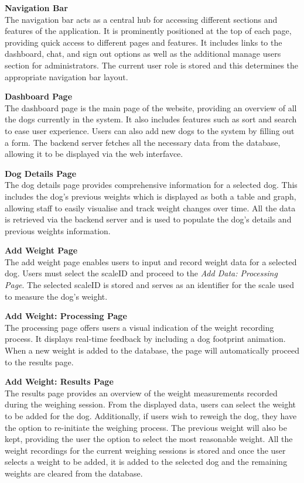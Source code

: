 \textbf{Navigation Bar}\\
The navigation bar acts as a central hub for accessing different sections and features of the application. It is prominently positioned at the top of each page, providing quick access to different pages and features. It includes links to the dashboard, chat, and sign out options as well as the additional manage users section for administrators. The current user role is stored and this determines the appropriate navigation bar layout.

\textbf{Dashboard Page}\\
The dashboard page is the main page of the website, providing an overview of all the dogs currently in the system. It also includes features such as sort and search to ease user experience. Users can also add new dogs to the system by filling out a form. The backend server fetches all the necessary data from the database, allowing it to be displayed via the web interfavce.

\textbf{Dog Details Page}\\
The dog details page provides comprehensive information for a selected dog. This includes the dog's previous weights which is displayed as both a table and graph, allowing staff to easily visualise and track weight changes over time. All the data is retrieved via the backend server and is used to populate the dog's details and previous weights information.

\textbf{Add Weight Page}\\
The add weight page enables users to input and record weight data for a selected dog. Users must select the scaleID and proceed to the \textit{Add Data: Processing Page}. The selected scaleID is stored and serves as an identifier for the scale used to measure the dog's weight.

\textbf{Add Weight: Processing Page}\\
The processing page offers users a visual indication of the weight recording process. It displays real-time feedback by including a dog footprint animation. When a new weight is added to the database, the page will automatically proceed to the results page.

\textbf{Add Weight: Results Page}\\
The results page provides an overview of the weight measurements recorded during the weighing session. From the displayed data, users can select the weight to be added for the dog. Additionally, if users wish to reweigh the dog, they have the option to re-initiate the weighing process. The previous weight will also be kept, providing the user the option to select the most reasonable weight. All the weight recordings for the current weighing sessions is stored and once the user selects a weight to be added, it is added to the selected dog and the remaining weights are cleared from the database.

